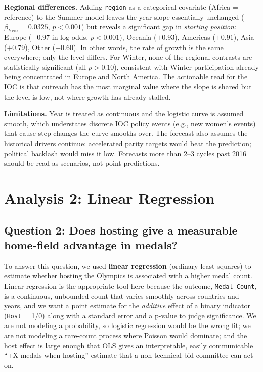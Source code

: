 \documentclass[11pt]{article}
\begin{document}
\textbf{Regional differences.} Adding \texttt{region} as a categorical covariate (Africa = reference) to the Summer model leaves the year slope essentially unchanged ($\beta_{\text{Year}} = 0.0325$, $p < 0.001$) but reveals a significant gap in \textit{starting position}: Europe ($+0.97$ in log-odds, $p < 0.001$), Oceania ($+0.93$), Americas ($+0.91$), Asia ($+0.79$), Other ($+0.60$). In other words, the rate of growth is the same everywhere; only the level differs. For Winter, none of the regional contrasts are statistically significant (all $p > 0.10$), consistent with Winter participation already being concentrated in Europe and North America. The actionable read for the IOC is that outreach has the most marginal value where the slope is shared but the level is low, not where growth has already stalled.

\textbf{Limitations.} Year is treated as continuous and the logistic curve is assumed smooth, which understates discrete IOC policy events (e.g., new women's events) that cause step-changes the curve smooths over. The forecast also assumes the historical drivers continue: accelerated parity targets would beat the prediction; political backlash would miss it low. Forecasts more than 2--3 cycles past 2016 should be read as scenarios, not point predictions.

\section*{Analysis 2: Linear Regression}

\subsection*{Question 2: Does hosting give a measurable home-field advantage in medals?}

To answer this question, we used \textbf{linear regression} (ordinary least squares) to estimate whether hosting the Olympics is associated with a higher medal count. Linear regression is the appropriate tool here because the outcome, \texttt{Medal\_Count}, is a continuous, unbounded count that varies smoothly across countries and years, and we want a point estimate for the \textit{additive} effect of a binary indicator (\texttt{Host} = 1/0) along with a standard error and a p-value to judge significance. We are not modeling a probability, so logistic regression would be the wrong fit; we are not modeling a rare-count process where Poisson would dominate; and the host effect is large enough that OLS gives an interpretable, easily communicable ``+X medals when hosting'' estimate that a non-technical bid committee can act on.
\end{document}
